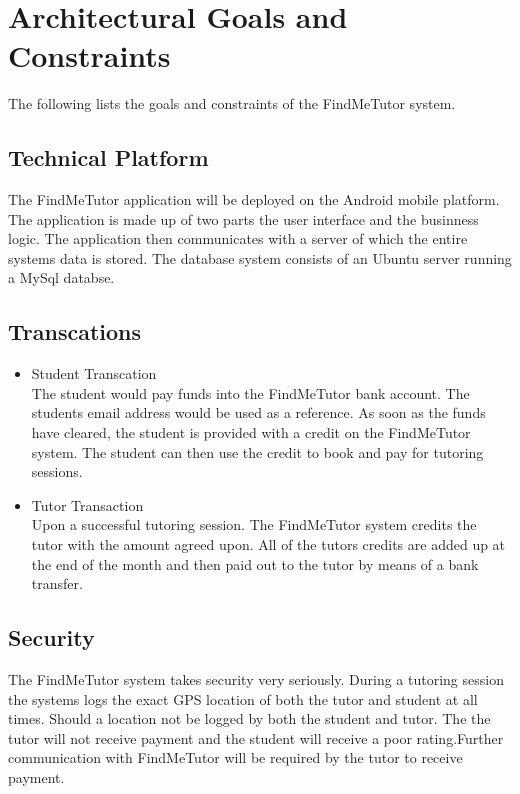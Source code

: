 \documentclass[12pt]{article}
\begin{document}
\pagebreak

\section{Architectural Goals and Constraints}
The following lists the goals and constraints of the FindMeTutor system.

\subsection{Technical Platform}
The FindMeTutor application will be deployed on the Android mobile platform. The application is made up of two parts the user interface and the businness logic. The application then communicates with a server of which the entire systems data is stored. The database system consists of an Ubuntu server running a MySql databse.\\

\subsection{Transcations}

\begin{itemize}
\item Student Transcation\\
The student would pay funds into the FindMeTutor bank account. The students email address would be used as a reference. As soon as the funds have cleared, the student is provided with a credit on the FindMeTutor system. The student can then use the credit to book and pay for tutoring sessions.

\item Tutor Transaction\\
Upon a successful tutoring session. The FindMeTutor system credits the tutor with the amount agreed upon. All of the tutors credits are added up at the end of the month and then paid out to the tutor by means of a bank transfer.
\end{itemize}

\subsection{Security}
The FindMeTutor system takes security very seriously. During a tutoring session the systems logs the exact GPS location of both the tutor and student at all times. Should a location not be logged by both the student and tutor. The the tutor will not receive payment and the student will receive a poor rating.Further communication with FindMeTutor will be required by the tutor to receive payment.
\end{document}
